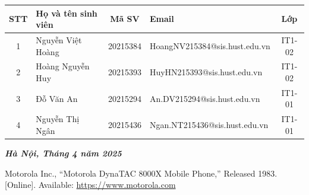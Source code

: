 \documentclass[12pt]{report}
\begin{document}
\vspace{0.3cm}
\renewcommand{\arraystretch}{1.5}

\begin{center}
\hspace*{-0.7cm}
\begin{tabular}{|c|>{\centering\arraybackslash}m{4cm}|c|>{\centering\arraybackslash}m{6.5cm}|c|}
\hline
\textbf{STT} & \textbf{Họ và tên sinh viên} & \textbf{Mã SV} & \textbf{Email} & \textbf{Lớp} \\
\hline
1 & Nguyễn Việt Hoàng & 20215384 & HoangNV215384@sis.hust.edu.vn & IT1-02 \\
\hline
2 & Hoàng Nguyễn Huy & 20215393 & HuyHN215393@sis.hust.edu.vn & IT1-02 \\
\hline
3 & Đỗ Văn An & 20215294 & An.DV215294@sis.hust.edu.vn & IT1-01 \\
\hline
4 & Nguyễn Thị Ngân & 20215436 & Ngan.NT215436@sis.hust.edu.vn & IT1-01 \\
\hline
\end{tabular}
\end{center}

\vspace{1.2cm}
\begin{center}
    \textit{\textbf{Hà Nội, Tháng 4 năm 2025}}
\end{center}
\restoregeometry

\tableofcontents
\listoffigures
\listoftables






\begin{thebibliography}{1}
  Motorola Inc., ``Motorola DynaTAC 8000X Mobile Phone,'' Released 1983. [Online]. Available: \url{https://www.motorola.com}
\end{thebibliography}
\end{document}
